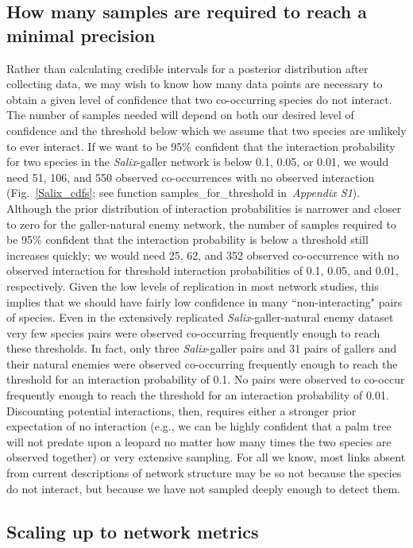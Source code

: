 \documentclass[12pt]{article}
\begin{document}
  \subsection*{How many samples are required to reach a minimal precision}

      Rather than calculating credible intervals for a posterior distribution after collecting data, we may wish to know how many data points are necessary to obtain a given level of confidence that two co-occurring species do not interact. The number of samples needed will depend on both our desired level of confidence and the threshold below which we assume that two species are unlikely to ever interact. If we want to be 95\% confident that the interaction probability for two species in the \emph{Salix}-galler network is below 0.1, 0.05, or 0.01, we would need 51, 106, and 550 observed co-occurrences with no observed interaction (Fig.~\ref{Salix_cdfs}; see function samples\_for\_threshold in~\emph{Appendix S1}). Although the prior distribution of interaction probabilities is narrower and closer to zero for the galler-natural enemy network, the number of samples required to be 95\% confident that the interaction probability is below a threshold still increases quickly; we would need 25, 62, and 352 observed co-occurrence with no observed interaction for threshold interaction probabilities of 0.1, 0.05, and 0.01, respectively. Given the low levels of replication in most network studies, this implies that we should have fairly low confidence in many ``non-interacting" pairs of species. Even in the extensively replicated \emph{Salix}-galler-natural enemy dataset very few species pairs were observed co-occurring frequently enough to reach these thresholds. In fact, only three \emph{Salix}-galler pairs and 31 pairs of gallers and their natural enemies were observed co-occurring frequently enough to reach the threshold for an interaction probability of 0.1. No pairs were observed to co-occur frequently enough to reach the threshold for an interaction probability of 0.01. Discounting potential interactions, then, requires either a stronger prior expectation of no interaction (e.g., we can be highly confident that a palm tree will not predate upon a leopard no matter how many times the two species are observed together) or very extensive sampling. For all we know, most links absent from current descriptions of network structure may be so not because the species do not interact, but because we have not sampled deeply enough to detect them.


  \subsection*{Scaling up to network metrics}
\end{document}
